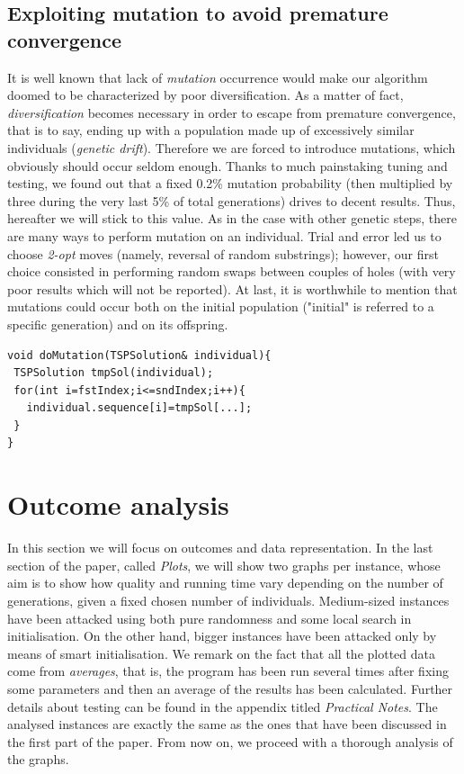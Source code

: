 \documentclass[letterpaper, 10 pt, conference]{ieeeconf}  %
\begin{document}
\subsection{Exploiting mutation to avoid premature convergence}
It is well known that lack of \textit{mutation} occurrence would make our algorithm doomed to be characterized by poor diversification. As a matter of fact, \textit{diversification} becomes necessary in order to escape from premature convergence, that is to say, ending up with a population made up of excessively similar individuals (\textit{genetic drift}). \newline
Therefore we are forced to introduce mutations, which obviously should occur seldom enough. Thanks to much painstaking tuning and testing, we found out that a fixed 0.2\% mutation probability (then multiplied by three during the very last 5\% of total generations) drives to decent results. Thus, hereafter we will stick to this value. \newline
As in the case with other genetic steps, there are many ways to perform mutation on an individual. Trial and error led us to choose \textit{2-opt} moves (namely, reversal of random substrings); however, our first choice consisted in performing random swaps between couples of holes (with very poor results which will not be reported). \newline
At last, it is worthwhile to mention that mutations could occur both on the initial population ("initial" is referred to a specific generation) and on its offspring.
\begin{lstlisting}[caption={2-opt move, in \texttt{TSPCrossover.h}}]
void doMutation(TSPSolution& individual){
 TSPSolution tmpSol(individual);
 for(int i=fstIndex;i<=sndIndex;i++){
   individual.sequence[i]=tmpSol[...];
 }
}
\end{lstlisting}

\section{Outcome analysis}
In this section we will focus on outcomes and data representation. In the last section of the paper, called \textit{Plots}, we will show two graphs per instance, whose aim is to show how quality and running time vary depending on the number of generations, given a fixed chosen number of individuals. Medium-sized instances have been attacked using both pure randomness and some local search in initialisation. On the other hand, bigger instances have been attacked only by means of smart initialisation. \newline 
We remark on the fact that all the plotted data come from \textit{averages}, that is, the program has been run several times
after fixing some parameters and then an average of the results has been calculated. Further details about testing can be found in the appendix titled \textit{Practical Notes}. \newline
The analysed instances are exactly the same as the ones that
have been discussed in the first part of the paper. \newline
From now on, we proceed with a thorough analysis of the graphs.
\end{document}
